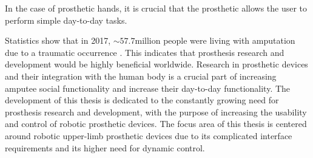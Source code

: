\documentclass[../main.tex]{subfiles}
\begin{document}
In the case of prosthetic hands, it is crucial that the prosthetic allows the user to perform simple day-to-day tasks.

Statistics show that in 2017, $\sim 57.7 \text{million}$ people were living with amputation due to a \gls{traumatic} occurrence \cite{McDonald2020}.
This indicates that prosthesis research and development would be highly beneficial worldwide.
Research in prosthetic devices and their integration with the human body is a crucial part of increasing amputee social functionality and increase their day-to-day functionality.
The development of this thesis is dedicated to the constantly growing need for prosthesis research and development, with the purpose of increasing the usability and control of robotic prosthetic devices.
The focus area of this thesis is centered around robotic upper-limb prosthetic devices due to its complicated interface requirements and its higher need for dynamic control.
\end{document}
